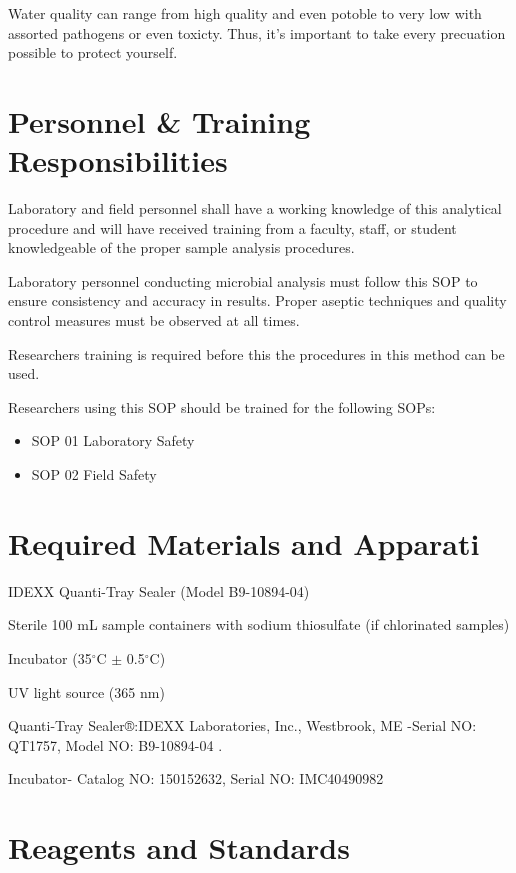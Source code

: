 \documentclass[12pt]{../SOP4_alpha}\usepackage[]{graphicx}\usepackage[]{xcolor}
\begin{document}
Water quality can range from high quality and even potoble to very low with assorted pathogens or even toxicty. Thus, it's important to take every precuation possible to protect yourself. 

\section{Personnel \& Training Responsibilities}

\NP Laboratory and field personnel shall have a working knowledge of this analytical procedure and will have received training from a faculty, staff, or student knowledgeable of the proper sample analysis procedures. 

\NP Laboratory personnel conducting microbial analysis must follow this SOP to ensure consistency and accuracy in results. Proper aseptic techniques and quality control measures must be observed at all times.

\NP Researchers training is required before this the procedures in this method can be used.

\NP Researchers using this SOP should be trained for the following SOPs:

\begin{itemize}
  \item SOP 01 Laboratory Safety
  \item SOP 02 Field Safety
\end{itemize}

\section{Required Materials and Apparati}

  \NP IDEXX Quanti-Tray Sealer (Model B9-10894-04) 

\NP Sterile 100 mL sample containers with sodium thiosulfate (if chlorinated samples)

\NP Incubator (35$^{\circ}$C $\pm$ 0.5$^{\circ}$C)

\NP UV light source (365 nm)

\NP Quanti-Tray Sealer®:IDEXX Laboratories, Inc., Westbrook, ME -Serial NO: QT1757, Model NO: B9-10894-04
.

\NP Incubator- Catalog NO: 150152632, Serial NO: IMC40490982


\section{Reagents and Standards}
\end{document}
